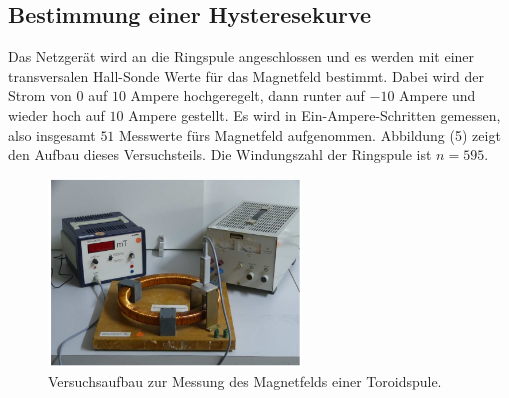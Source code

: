 \subsection{Bestimmung einer Hysteresekurve}
Das Netzgerät wird an die Ringspule angeschlossen und es werden mit einer transversalen Hall-Sonde Werte für das Magnetfeld bestimmt.
Dabei wird der Strom von $0$ auf $10$ Ampere hochgeregelt, dann runter auf $-10$ Ampere und wieder hoch auf $10$ Ampere gestellt. Es wird in Ein-Ampere-Schritten gemessen, also insgesamt $51$ Messwerte fürs Magnetfeld aufgenommen.
Abbildung (5) zeigt den Aufbau dieses Versuchsteils. Die Windungszahl der Ringspule ist $n = 595$.
\begin{figure}[H]
  \centering
  \includegraphics[height=5cm]{drei.png}
  \caption{Versuchsaufbau zur Messung des Magnetfelds einer Toroidspule. \cite[S. 5]{sample}}
\end{figure}